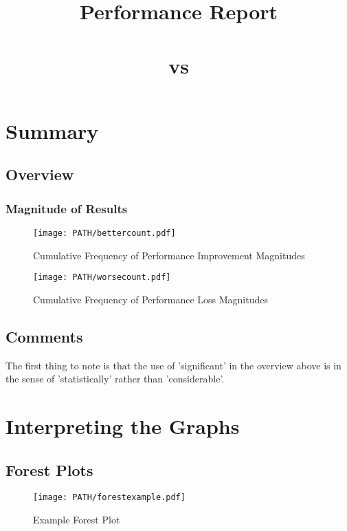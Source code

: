 \documentclass[a4paper, 12pt, notitlepage]{report}
\date{}
\title{Performance Report\\\vspace{10mm}\xsversion\\vs\\\refversion}
\begin{document}
\maketitle

\chapter* {Summary}

\section*{Overview}



\subsection*{Magnitude of Results}

\begin{figure}[h]
\centering
\texttt{[image: PATH/bettercount.pdf]}
\caption{Cumulative Frequency of Performance Improvement Magnitudes}
\end{figure}

\begin{figure}[h]
\centering
\texttt{[image: PATH/worsecount.pdf]}
\caption{Cumulative Frequency of Performance Loss Magnitudes}
\end{figure}

\section*{Comments}

The first thing to note is that the use of 'significant' in the overview above is in
the sense of 'statistically' rather than 'considerable'.
 


\newpage

\tableofcontents

\newpage

\chapter {Interpreting the Graphs}

\section{Forest Plots}

\begin{figure}[h]
\centering
\texttt{[image: PATH/forestexample.pdf]}
\caption{Example Forest Plot}
\end{figure}
\end{document}
